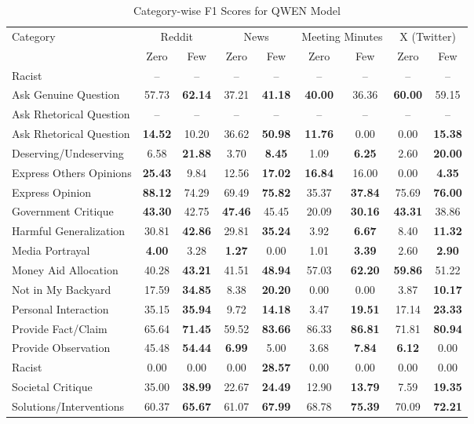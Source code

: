 \begin{table*}[htbp]
\centering
\begin{tabular}{l *{8}{c}}
\toprule
Category & \multicolumn{2}{c}{Reddit} & \multicolumn{2}{c}{News} & \multicolumn{2}{c}{Meeting Minutes} & \multicolumn{2}{c}{X (Twitter)} \\
& Zero & Few & Zero & Few & Zero & Few & Zero & Few \\
\midrule
Racist & -- & -- & -- & -- & -- & -- & -- & -- \\
Ask Genuine Question & 57.73 & \textbf{62.14} & 37.21 & \textbf{41.18} & \textbf{40.00} & 36.36 & \textbf{60.00} & 59.15 \\
Ask Rhetorical Question & -- & -- & -- & -- & -- & -- & -- & -- \\
Ask Rhetorical Question & \textbf{14.52} & 10.20 & 36.62 & \textbf{50.98} & \textbf{11.76} & 0.00 & 0.00 & \textbf{15.38} \\
Deserving/Undeserving & 6.58 & \textbf{21.88} & 3.70 & \textbf{8.45} & 1.09 & \textbf{6.25} & 2.60 & \textbf{20.00} \\
Express Others Opinions & \textbf{25.43} & 9.84 & 12.56 & \textbf{17.02} & \textbf{16.84} & 16.00 & 0.00 & \textbf{4.35} \\
Express Opinion & \textbf{88.12} & 74.29 & 69.49 & \textbf{75.82} & 35.37 & \textbf{37.84} & 75.69 & \textbf{76.00} \\
Government Critique & \textbf{43.30} & 42.75 & \textbf{47.46} & 45.45 & 20.09 & \textbf{30.16} & \textbf{43.31} & 38.86 \\
Harmful Generalization & 30.81 & \textbf{42.86} & 29.81 & \textbf{35.24} & 3.92 & \textbf{6.67} & 8.40 & \textbf{11.32} \\
Media Portrayal & \textbf{4.00} & 3.28 & \textbf{1.27} & 0.00 & 1.01 & \textbf{3.39} & 2.60 & \textbf{2.90} \\
Money Aid Allocation & 40.28 & \textbf{43.21} & 41.51 & \textbf{48.94} & 57.03 & \textbf{62.20} & \textbf{59.86} & 51.22 \\
Not in My Backyard & 17.59 & \textbf{34.85} & 8.38 & \textbf{20.20} & 0.00 & 0.00 & 3.87 & \textbf{10.17} \\
Personal Interaction & 35.15 & \textbf{35.94} & 9.72 & \textbf{14.18} & 3.47 & \textbf{19.51} & 17.14 & \textbf{23.33} \\
Provide Fact/Claim & 65.64 & \textbf{71.45} & 59.52 & \textbf{83.66} & 86.33 & \textbf{86.81} & 71.81 & \textbf{80.94} \\
Provide Observation & 45.48 & \textbf{54.44} & \textbf{6.99} & 5.00 & 3.68 & \textbf{7.84} & \textbf{6.12} & 0.00 \\
Racist & 0.00 & 0.00 & 0.00 & \textbf{28.57} & 0.00 & 0.00 & 0.00 & 0.00 \\
Societal Critique & 35.00 & \textbf{38.99} & 22.67 & \textbf{24.49} & 12.90 & \textbf{13.79} & 7.59 & \textbf{19.35} \\
Solutions/Interventions & 60.37 & \textbf{65.67} & 61.07 & \textbf{67.99} & 68.78 & \textbf{75.39} & 70.09 & \textbf{72.21} \\
\bottomrule
\end{tabular}
\centering\caption{Category-wise F1 Scores for QWEN Model}
\label{tab:qwen_category_breakdown}
\end{table*}